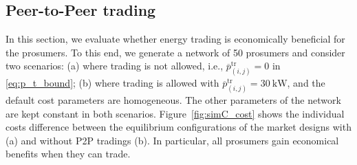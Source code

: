 \documentclass{IEEEtran}  %
\newcommand{\0}{\mathbf{0}}
\newcommand{\1}{\mathbf{1}}
\begin{document}
\subsection{Peer-to-Peer trading}
In this section, we evaluate whether energy trading is economically beneficial for the prosumers. To this end, 
we generate a network of 50 prosumers and consider two scenarios: (a) where trading is not allowed, i.e., $\overline{p}_{(i,j)}^{\mathrm{tr}}=0$ in \eqref{eq:p_t_bound}; (b) where trading is allowed with $\overline{p}_{(i,j)}^{\mathrm{tr}}=30 \ \mathrm{kW}$, and the default cost parameters are homogeneous. The other parameters of the network are kept constant in both scenarios. Figure~\ref{fig:simC_cost} shows the individual costs difference between the equilibrium configurations of the market designs with (a) and without P2P tradings (b). In particular, all prosumers gain economical benefits when they can trade.
\end{document}
